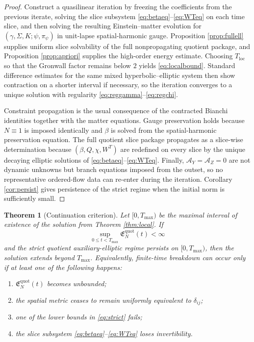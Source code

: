 \documentclass[11pt]{article}
\newcommand{\AY}{\mathcal A_Y}
\newcommand{\AZ}{\mathcal A_Z}
\newtheorem{theorem}{Theorem}
\begin{document}
\begin{proof}
Construct a quasilinear iteration by freezing the coefficients from the previous iterate, solving the slice subsystem \eqref{eq:betaeq}--\eqref{eq:WTeq} on each time slice, and then solving the resulting Einstein--matter evolution for \((\gamma,\Sigma,K;\psi,\pi_\psi)\) in unit-lapse spatial-harmonic gauge. Proposition \ref{prop:fullell} supplies uniform slice solvability of the full nonpropagating quotient package, and Proposition \ref{prop:apriori} supplies the high-order energy estimate. Choosing \(T_{\mathrm{loc}}\) so that the Gronwall factor remains below \(2\) yields \eqref{eq:localbound}. Standard difference estimates for the same mixed hyperbolic--elliptic system then show contraction on a shorter interval if necessary, so the iteration converges to a unique solution with regularity \eqref{eq:reggamma}--\eqref{eq:regchi}.

Constraint propagation is the usual consequence of the contracted Bianchi identities together with the matter equations. Gauge preservation holds because \(N\equiv 1\) is imposed identically and \(\beta\) is solved from the spatial-harmonic preservation equation. The full quotient slice package propagates as a slice-wise determination because \((\beta,Q,\chi,W^T)\) are redefined on every slice by the unique decaying elliptic solutions of \eqref{eq:betaeq}--\eqref{eq:WTeq}. Finally, \(\AY=\AZ=0\) are not dynamic unknowns but branch equations imposed from the outset, so no representative ordered-flow data can re-enter during the iteration. Corollary \ref{cor:persist} gives persistence of the strict regime when the initial norm is sufficiently small.
\end{proof}

\begin{theorem}[Continuation criterion]
\label{thm:cont}
Let \([0,T_{\max})\) be the maximal interval of existence of the solution from Theorem \ref{thm:local}. If
\begin{equation}
\sup_{0\le t<T_{\max}}\mathfrak E_N^{\mathrm{quot}}(t)<\infty
\label{eq:Enbounded}
\end{equation}
and the strict quotient auxiliary-elliptic regime persists on \([0,T_{\max})\), then the solution extends beyond \(T_{\max}\). Equivalently, finite-time breakdown can occur only if at least one of the following happens:
\begin{enumerate}
    \item \(\mathfrak E_N^{\mathrm{quot}}(t)\) becomes unbounded;
    \item the spatial metric ceases to remain uniformly equivalent to \(\delta_{ij}\);
    \item one of the lower bounds in \eqref{eq:strict} fails;
    \item the slice subsystem \eqref{eq:betaeq}--\eqref{eq:WTeq} loses invertibility.
\end{enumerate}
\end{theorem}
\end{document}
